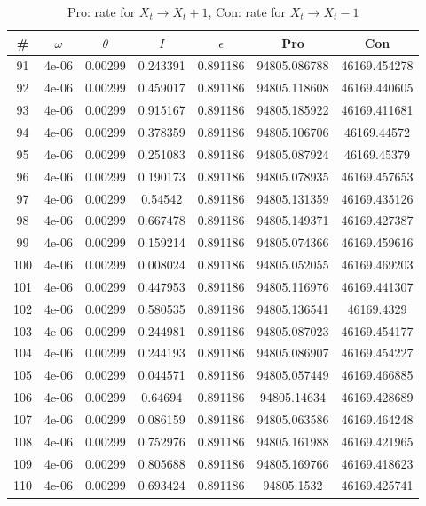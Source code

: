 \newpage
\begin{table}
\caption{Pro: rate for $X_t \rightarrow X_t + 1$, Con: rate for $X_t \rightarrow X_t - 1$}
\begin{tabular*}{\linewidth}{c|c|c|c|c|c|c}
\# & $\omega$ & $\theta$ & $I$ & $\epsilon$ & Pro & Con \\
\hline
91 & 4e-06 & 0.00299 & 0.243391 & 0.891186 & 94805.086788 & 46169.454278\\
92 & 4e-06 & 0.00299 & 0.459017 & 0.891186 & 94805.118608 & 46169.440605\\
93 & 4e-06 & 0.00299 & 0.915167 & 0.891186 & 94805.185922 & 46169.411681\\
94 & 4e-06 & 0.00299 & 0.378359 & 0.891186 & 94805.106706 & 46169.44572\\
95 & 4e-06 & 0.00299 & 0.251083 & 0.891186 & 94805.087924 & 46169.45379\\
96 & 4e-06 & 0.00299 & 0.190173 & 0.891186 & 94805.078935 & 46169.457653\\
97 & 4e-06 & 0.00299 & 0.54542 & 0.891186 & 94805.131359 & 46169.435126\\
98 & 4e-06 & 0.00299 & 0.667478 & 0.891186 & 94805.149371 & 46169.427387\\
99 & 4e-06 & 0.00299 & 0.159214 & 0.891186 & 94805.074366 & 46169.459616\\
100 & 4e-06 & 0.00299 & 0.008024 & 0.891186 & 94805.052055 & 46169.469203\\
101 & 4e-06 & 0.00299 & 0.447953 & 0.891186 & 94805.116976 & 46169.441307\\
102 & 4e-06 & 0.00299 & 0.580535 & 0.891186 & 94805.136541 & 46169.4329\\
103 & 4e-06 & 0.00299 & 0.244981 & 0.891186 & 94805.087023 & 46169.454177\\
104 & 4e-06 & 0.00299 & 0.244193 & 0.891186 & 94805.086907 & 46169.454227\\
105 & 4e-06 & 0.00299 & 0.044571 & 0.891186 & 94805.057449 & 46169.466885\\
106 & 4e-06 & 0.00299 & 0.64694 & 0.891186 & 94805.14634 & 46169.428689\\
107 & 4e-06 & 0.00299 & 0.086159 & 0.891186 & 94805.063586 & 46169.464248\\
108 & 4e-06 & 0.00299 & 0.752976 & 0.891186 & 94805.161988 & 46169.421965\\
109 & 4e-06 & 0.00299 & 0.805688 & 0.891186 & 94805.169766 & 46169.418623\\
110 & 4e-06 & 0.00299 & 0.693424 & 0.891186 & 94805.1532 & 46169.425741\\

\end{tabular*}
\end{table}
